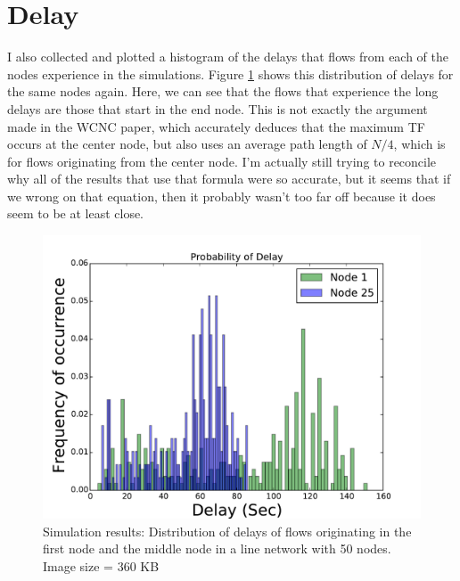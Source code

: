 \documentclass[conference]{IEEEtran}
\begin{document}
\section{Delay}

I also collected and plotted a histogram of the delays that flows from each of the nodes experience in the simulations.  Figure \ref{fig:delay_dist_sim_N_50_IS_360} shows this distribution of delays for the same nodes again.  Here, we can see that the flows that experience the long delays are those that start in the end node.  This is not exactly the argument made in the WCNC paper, which accurately deduces that the maximum TF occurs at the center node, but also uses an average path length of $N/4$, which is for flows originating from the center node.  I'm actually still trying to reconcile why all of the results that use that formula were so accurate, but it seems that if we wrong on that equation, then it probably wasn't too far off because it does seem to be at least close. 

\begin{figure}
\begin{centering}
    \includegraphics[scale=0.4, clip=true, trim=0mm 0mm 0mm 0mm]{figs_exp_vs_anal/num_nodes_50/image_size_360/timeliness_165/line_net/delay_histogram.pdf}
    \caption{ Simulation results: Distribution of delays of flows originating in the first node and the middle node in a line network with 50 nodes.  Image size = 360 KB}
    \label{fig:delay_dist_sim_N_50_IS_360}
\end{centering}
\end{figure}
\end{document}
